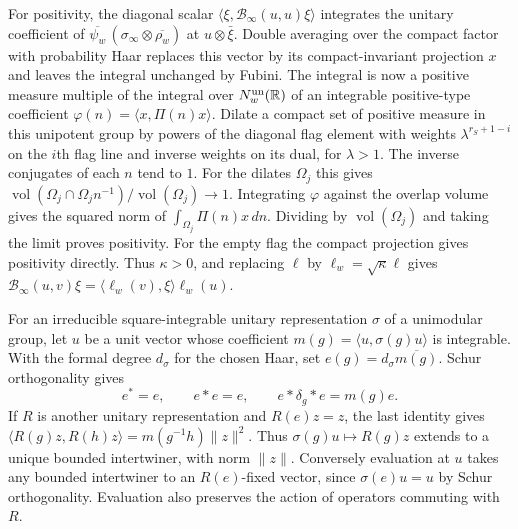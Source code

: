 For positivity, the diagonal scalar
\(\langle\xi,\mathcal B_\infty(u,u)\xi\rangle\) integrates the unitary
coefficient of
\(\overline{\psi_w}\,(\sigma_\infty\otimes\overline{\rho_w})\)
at \(u\otimes\bar\xi\). Double averaging over the compact factor
with probability Haar replaces this vector by its compact-invariant
projection \(x\) and leaves the integral unchanged by Fubini.
The integral is now a positive measure multiple of the integral over
\(N_w^{\rm un}(\mathbb R)\) of an integrable positive-type coefficient
\(\varphi(n)=\langle x,\Pi(n)x\rangle\). Dilate a compact set of positive
measure in this unipotent group by powers of the diagonal flag element
with weights \(\lambda^{r_S+1-i}\) on the \(i\)th flag line and inverse
weights on its dual, for \(\lambda>1\). The inverse conjugates of each
\(n\) tend to \(1\). For the dilates \(\Omega_j\) this gives
\(\operatorname{vol}(\Omega_j\cap\Omega_j n^{-1})/
\operatorname{vol}(\Omega_j)\to1\).
Integrating \(\varphi\) against the overlap volume gives the squared
norm of \(\int_{\Omega_j}\Pi(n)x\,dn\). Dividing by
\(\operatorname{vol}(\Omega_j)\) and taking the limit proves positivity.
For the empty flag the compact projection gives positivity directly.
Thus \(\kappa>0\), and replacing \(\ell\) by \(\ell_w=\sqrt{\kappa}\ell\)
gives \(\mathcal B_\infty(u,v)\xi=\langle\ell_w(v),\xi\rangle\ell_w(u)\).

\leavevmode{}%
For an irreducible square-integrable unitary representation \(\sigma\)
of a unimodular group, let \(u\) be a unit vector whose coefficient
\(m(g)=\langle u,\sigma(g)u\rangle\) is integrable. With the formal
degree \(d_\sigma\) for the chosen Haar, set
\(e(g)=d_\sigma\overline{m(g)}\). Schur orthogonality gives
\begin{equation}
 \label{eq:formal-degree-projector}
 e^*=e,\qquad e*e=e,\qquad e*\delta_g*e=m(g)e .
\end{equation}
If \(R\) is another unitary representation and \(R(e)z=z\), the
last identity gives
\(\langle R(g)z,R(h)z\rangle=m(g^{-1}h)\|z\|^2\).
Thus \(\sigma(g)u\mapsto R(g)z\) extends to a unique bounded
intertwiner, with norm \(\|z\|\). Conversely evaluation at \(u\)
takes any bounded intertwiner to an \(R(e)\)-fixed vector, since
\(\sigma(e)u=u\) by Schur orthogonality. Evaluation also preserves
the action of operators commuting with \(R\).

